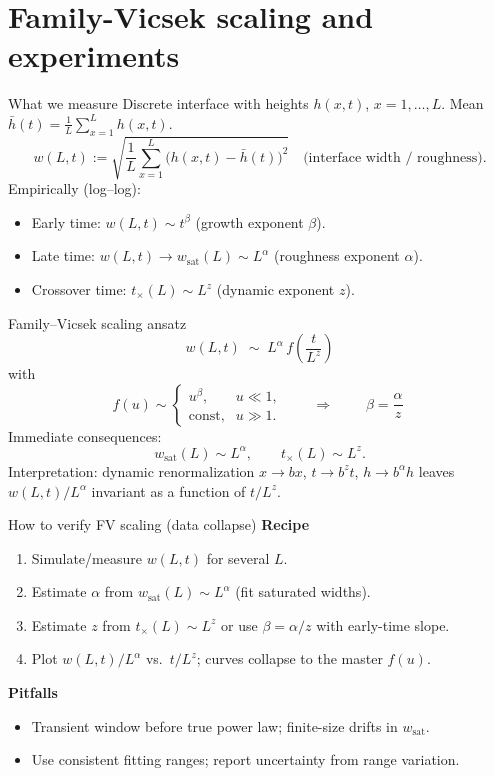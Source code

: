\documentclass[9pt,table,xcolor=dvipsnames]{beamer}
\begin{document}
\section{Family-Vicsek scaling and experiments}

\begin{frame}[t]{What we measure}
\small
Discrete interface with heights $h(x,t)$, $x=1,\dots,L$. Mean
$\bar h(t)=\frac1L\sum_{x=1}^L h(x,t)$.
\[
w(L,t)
:=\sqrt{\frac1L\sum_{x=1}^L\big(h(x,t)-\bar h(t)\big)^2}
\quad\text{(interface width / roughness)}.
\]
Empirically (log–log):
\begin{itemize}\itemsep2pt
\item Early time: $w(L,t)\sim t^{\beta}$ (growth exponent $\beta$).
\item Late time: $w(L,t)\to w_{\mathrm{sat}}(L)\sim L^{\alpha}$ (roughness exponent $\alpha$).
\item Crossover time: $t_\times(L)\sim L^{z}$ (dynamic exponent $z$).
\end{itemize}
\end{frame}

\begin{frame}[t]{Family–Vicsek scaling ansatz}
\small
\[
\boxed{\;w(L,t)\;\sim\; L^{\alpha}\, f\!\left(\dfrac{t}{L^{z}}\right)\;}
\]
with
\[
f(u)\sim 
\begin{cases}
u^{\beta}, & u\ll1,\\[2pt]
\text{const}, & u\gg1.
\end{cases}
\qquad\Rightarrow\qquad
\boxed{\;\beta=\dfrac{\alpha}{z}\;}
\]
Immediate consequences:
\[
w_{\mathrm{sat}}(L) \sim L^{\alpha},\qquad
t_\times(L)\sim L^{z}.
\]
Interpretation: dynamic renormalization $x\!\to\! b x$, $t\!\to\! b^{z}t$, $h\!\to\! b^{\alpha}h$ leaves $w(L,t)/L^{\alpha}$ invariant as a function of $t/L^{z}$.
\end{frame}

\begin{frame}[t]{How to verify FV scaling (data collapse)}
\small
\textbf{Recipe}
\begin{enumerate}\itemsep2pt
\item Simulate/measure $w(L,t)$ for several $L$.
\item Estimate $\alpha$ from $w_{\mathrm{sat}}(L)\!\sim\! L^{\alpha}$ (fit saturated widths).
\item Estimate $z$ from $t_\times(L)\!\sim\! L^{z}$ or use $\beta=\alpha/z$ with early-time slope.
\item Plot $w(L,t)/L^{\alpha}$ vs.\ $t/L^{z}$; curves collapse to the master $f(u)$.
\end{enumerate}
\textbf{Pitfalls}
\begin{itemize}\itemsep2pt
\item Transient window before true power law; finite-size drifts in $w_{\mathrm{sat}}$.
\item Use consistent fitting ranges; report uncertainty from range variation.
\end{itemize}
\end{frame}
\end{document}
